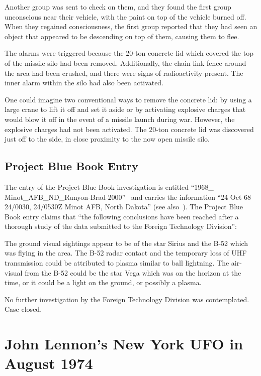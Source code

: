 Another group was sent to check on them, and they found the first group unconscious near their vehicle,
with the paint on top of the vehicle burned off.
When they regained consciousness, the first group reported that they had seen an object that appeared to be descending on top of them,
causing them to flee.


The alarms were triggered because the 20-ton concrete lid which covered the top of the missile silo had been removed.
Additionally, the chain link fence around the area had been crushed,
 and there were signs of radioactivity present.
The inner alarm within the silo had also been activated.

One could imagine two conventional ways to remove the concrete lid:
by using a large crane to lift it off and set it aside or by activating explosive charges that would blow it off in the event of a missile launch
during war.
However, the explosive charges had not been activated.
The 20-ton concrete lid was discovered just off to the side, in close proximity to the now open missile silo.

\subsection{Project Blue Book Entry}

The entry of the Project Blue Book investigation is entitled ``1968\_-Minot\_AFB\_ND\_Runyon-Brad-2000''~\cite{bluebook-directory-listing}
and carries the information ``24 Oct 68 24/0030, 24/0530Z Minot AFB, North Dakota''
(see also~\cite{MinotAFBPBB1968}). The
Project Blue Book entry claims that ``the following conclusions have been reached after a thorough study of the
data submitted to the Foreign Technology Division'':
\begin{svgraybox}
The ground visual sightings appear
to be of the star Sirius and the B-52 which was flying in the area. The B-52 radar contact
and the temporary loss of UHF transmission could be attributed to plasma similar to
ball lightning. The air-visual from the B-52 could be the star Vega which was on the
horizon at the time, or it could be a light on the ground, or possibly a plasma.
\end{svgraybox}
No further investigation by the Foreign Technology Division was contemplated.
Case closed.


\section{John Lennon's New York UFO in August 1974}

